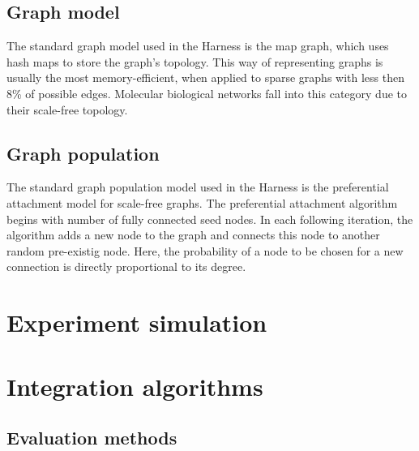 \documentclass{scrartcl}
\begin{document}
\subsection{Graph model}
\label{graph model}
The standard graph model used in the Harness is the map graph, which uses hash maps to store the graph's topology. This way of representing graphs is usually the most memory-efficient, when applied to sparse graphs with less then 8\% of possible edges. Molecular biological networks fall into this category due to their scale-free topology.


\subsection{Graph population}
\label{graph population}

The standard graph population model used in the Harness is the preferential attachment model for scale-free graphs. The preferential attachment algorithm begins with number of fully connected seed nodes. In each following iteration, the algorithm adds a new node to the graph and connects this node to another random pre-existig node. Here, the probability of a node to be chosen for a new connection is directly proportional to its degree.


\section{Experiment simulation}


\section{Integration algorithms}

\subsection{Evaluation methods}
\end{document}
